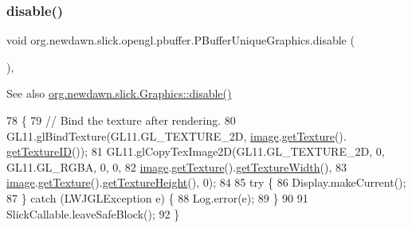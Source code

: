 \subsubsection{\texorpdfstring{disable()}{disable()}}
{\footnotesize\ttfamily void org.\+newdawn.\+slick.\+opengl.\+pbuffer.\+P\+Buffer\+Unique\+Graphics.\+disable (\begin{DoxyParamCaption}{ }\end{DoxyParamCaption})\hspace{0.3cm}{\ttfamily [inline]}, {\ttfamily [protected]}}

\begin{DoxySeeAlso}{See also}
\mbox{\hyperlink{classorg_1_1newdawn_1_1slick_1_1_graphics_a7979c584c48fc28175289e0012d5c943}{org.\+newdawn.\+slick.\+Graphics\+::disable()}} 
\end{DoxySeeAlso}

\begin{DoxyCode}
78                              \{
79         \textcolor{comment}{// Bind the texture after rendering.}
80         GL11.glBindTexture(GL11.GL\_TEXTURE\_2D, \mbox{\hyperlink{classorg_1_1newdawn_1_1slick_1_1opengl_1_1pbuffer_1_1_p_buffer_unique_graphics_abc5d45be7087d1aeb486c2fae5c194ca}{image}}.\mbox{\hyperlink{classorg_1_1newdawn_1_1slick_1_1_image_a9c033386a3dcbb5e2f2ae2354e06d5bd}{getTexture}}().
      \mbox{\hyperlink{interfaceorg_1_1newdawn_1_1slick_1_1opengl_1_1_texture_a0d846c1cfcc66768db002d4eb06ad841}{getTextureID}}());
81         GL11.glCopyTexImage2D(GL11.GL\_TEXTURE\_2D, 0, GL11.GL\_RGBA, 0, 0, 
82                               \mbox{\hyperlink{classorg_1_1newdawn_1_1slick_1_1opengl_1_1pbuffer_1_1_p_buffer_unique_graphics_abc5d45be7087d1aeb486c2fae5c194ca}{image}}.\mbox{\hyperlink{classorg_1_1newdawn_1_1slick_1_1_image_a9c033386a3dcbb5e2f2ae2354e06d5bd}{getTexture}}().\mbox{\hyperlink{interfaceorg_1_1newdawn_1_1slick_1_1opengl_1_1_texture_aa85f8503feafc2f18472a4deb2a67b4e}{getTextureWidth}}(), 
83                               \mbox{\hyperlink{classorg_1_1newdawn_1_1slick_1_1opengl_1_1pbuffer_1_1_p_buffer_unique_graphics_abc5d45be7087d1aeb486c2fae5c194ca}{image}}.\mbox{\hyperlink{classorg_1_1newdawn_1_1slick_1_1_image_a9c033386a3dcbb5e2f2ae2354e06d5bd}{getTexture}}().\mbox{\hyperlink{interfaceorg_1_1newdawn_1_1slick_1_1opengl_1_1_texture_a6626d0905e80214b320fb0042ad0e98d}{getTextureHeight}}(), 0);
84         
85         \textcolor{keywordflow}{try} \{
86             Display.makeCurrent();
87         \} \textcolor{keywordflow}{catch} (LWJGLException e) \{
88             Log.error(e);
89         \}
90         
91         SlickCallable.leaveSafeBlock();
92     \}
\end{DoxyCode}
\mbox{\label{classorg_1_1newdawn_1_1slick_1_1opengl_1_1pbuffer_1_1_p_buffer_unique_graphics_a7aa1fcde7766aaef6c02992cfc9c4955}} 
